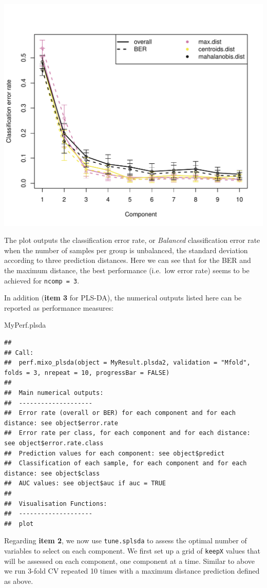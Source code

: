 \documentclass[]{book}
\newenvironment{Shaded}{\begin{snugshade}}{\end{snugshade}}
\newcommand{\NormalTok}[1]{#1}
\begin{document}
\begin{center}\includegraphics[width=0.5\linewidth]{Figures/04-plsda-perf-1-1} \end{center}

The plot outputs the classification error rate, or \emph{Balanced} classification error rate when the number of samples per group is unbalanced, the standard deviation according to three prediction distances. Here we can see that for the BER and the maximum distance, the best performance (i.e.~low error rate) seems to be achieved for \texttt{ncomp\ =\ 3}.

In addition (\textbf{item 3} for PLS-DA), the numerical outputs listed here can be reported as performance measures:

\begin{Shaded}
\begin{Highlighting}[]
\NormalTok{MyPerf.plsda}
\end{Highlighting}
\end{Shaded}

\begin{verbatim}
## 
## Call:
##  perf.mixo_plsda(object = MyResult.plsda2, validation = "Mfold", folds = 3, nrepeat = 10, progressBar = FALSE) 
## 
##  Main numerical outputs: 
##  -------------------- 
##  Error rate (overall or BER) for each component and for each distance: see object$error.rate 
##  Error rate per class, for each component and for each distance: see object$error.rate.class 
##  Prediction values for each component: see object$predict 
##  Classification of each sample, for each component and for each distance: see object$class 
##  AUC values: see object$auc if auc = TRUE 
## 
##  Visualisation Functions: 
##  -------------------- 
##  plot
\end{verbatim}

Regarding \textbf{item 2}, we now use \texttt{tune.splsda} to assess the optimal number of variables to select on each component. We first set up a grid of \texttt{keepX} values that will be assessed on each component, one component at a time.
Similar to above we run 3-fold CV repeated 10 times with a maximum distance prediction defined as above.
\end{document}
